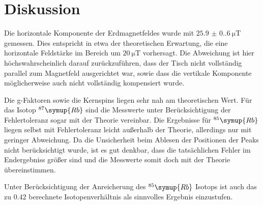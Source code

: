 \section{Diskussion}
\label{sec:Diskussion}

Die horizontale Komponente der Erdmagnetfeldes wurde mit $\qty{25.9(0.6)}{\micro\tesla}$ gemessen.
Dies entspricht in etwa der theoretischen Erwartung, die eine horizontale Feldstärke im Bereich um
$\qty{20}{\micro\tesla}$ vorhersagt. Die Abweichung ist hier höchswahrscheinlich darauf zurückzuführen,
dass der Tisch nicht vollständig parallel zum Magnetfeld ausgerichtet war, sowie dass die vertikale
Komponente möglicherweise auch nicht vollständig kompensiert wurde.

Die g-Faktoren sowie die Kernspins liegen sehr nah am theoretischen Wert. Für das Isotop
$^{87}\symup{Rb}$ sind die Messwerte unter Berücksichtigung der Fehlertoleranz sogar mit der
Theorie vereinbar.
Die Ergebnisse für $^{85}\symup{Rb}$ liegen selbst mit Fehlertoleranz leicht außerhalb der Theorie,
allerdings nur mit geringer Abweichung. Da die Unsicherheit beim Ablesen der Positionen der
Peaks nicht berücksichtigt wurde, ist es gut denkbar, dass die tatsächlichen Fehler im Endergebniss
größer sind und die Messwerte somit doch mit der Theorie übereinstimmen.

Unter Berücksichtigung der Anreicherung des $^{85}\symup{Rb}$ Isotops ist auch das zu $0.42$
berechnete Isotopenverhältnis als sinnvolles Ergebnis einzustufen.